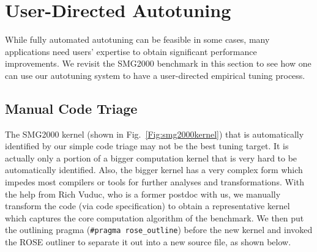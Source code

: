 \clearpage
\section{User-Directed Autotuning}
While fully automated autotuning can be feasible in some cases, many
applications need users' expertise to obtain significant performance improvements. 
We revisit the SMG2000 benchmark in this section to see how one can use our autotuning system to have a user-directed empirical tuning process.
\subsection{Manual Code Triage}
The SMG2000 kernel (shown in Fig.~\ref{Fig:smg2000kernel}) that is automatically identified by our simple code triage may not be the best tuning target. 
It is actually only a portion of a bigger computation kernel that is very
hard to be automatically identified. 
Also, the bigger kernel has a very complex form which impedes most
compilers or tools for further analyses and transformations. 
With the help from Rich Vuduc, who is a former postdoc with us, we manually transform the code (via code specification) to obtain a representative kernel which captures the core computation algorithm of the benchmark. 
We then put the outlining pragma (\lstinline{#pragma rose_outline}) before
the new kernel and invoked the ROSE outliner to separate it out into a new
source file, as shown below.

